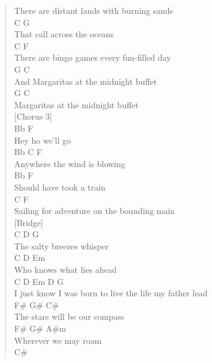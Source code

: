 \documentclass[11pt]{article}
\begin{document}
\begin{verse}
There are distant lands with burning sands\\
\hspace*{5em}C               G\\
That call across the oceans\\
\hspace*{10em}C                 F\\
There are bingo games every fun-filled day\\
\hspace*{4em}G                 C\\
And Margaritas at the midnight buffet\\
G                 C\\
Margaritas at the midnight buffet\\
\vspace*{1em}
[Chorus 3]\\
Bb     F\\
Hey ho we'll go\\
Bb  C        F\\
Anywhere the wind is blowing\\
Bb          F\\
Should have took a train\\
C                            F\\
Sailing for adventure on the bounding main\\
\vspace*{1em}
[Bridge]\\
\hspace*{4em}C     D       G\\
The salty breezes whisper\\
\hspace*{4em}C          D    Em\\
Who knows what lies ahead\\
\hspace*{2em}C               D       Em       D              G\\
I just know I was born to live the life my father lead\\
\hspace*{4em}F\#         G\#     C\#\\
The stars will be our compass\\
\hspace*{4em}F\#   G\#     A\#m\\
Wherever we may roam\\
\hspace*{8em}C\#\\

\end{verse}
\end{document}
